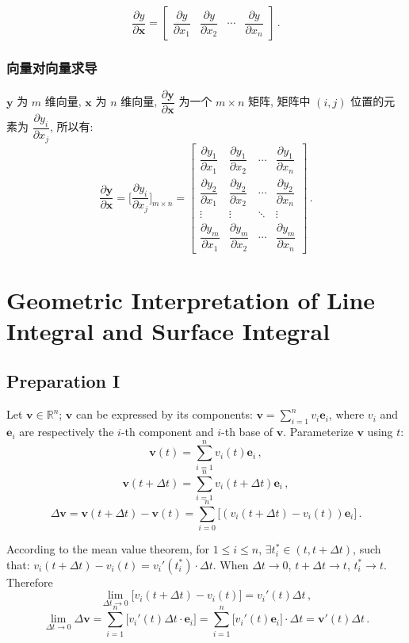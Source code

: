 \documentclass[UTF8]{ctexart}
\newcommand{\ve}[1]{\boldsymbol{\mathbf{#1}}}
\newcommand{\R}{\mathbb R}
\begin{document}
\[ \dfrac{\partial y}{\partial \ve{x}} = \begin{bmatrix}
    \dfrac{\partial y}{\partial x_1} & \dfrac{\partial y}{\partial x_2} & \cdots & \dfrac{\partial y}{\partial x_n}
\end{bmatrix} \,.\]

\subsubsection{向量对向量求导}
$ \ve{y} $ 为 $ m $ 维向量, $ \ve{x} $ 为 $ n $ 维向量, $ \dfrac{\partial \ve{y}}{\partial \ve{x}} $ 为一个 $ m \times n $ 矩阵, 矩阵中 $ (i, j) $ 位置的元素为 $ \dfrac{\partial y_i}{\partial x_j} $, 所以有: 
\[ \dfrac{\partial \ve{y}}{\partial \ve{x}} = \Big[ \dfrac{\partial y_i}{\partial x_j} \Big]_{m \times n} = \begin{bmatrix}
    \dfrac{\partial y_1}{\partial x_1} & \dfrac{\partial y_1}{\partial x_2} & \cdots & \dfrac{\partial y_1}{\partial x_n} \\
    \dfrac{\partial y_2}{\partial x_1} & \dfrac{\partial y_2}{\partial x_2} & \cdots & \dfrac{\partial y_2}{\partial x_n} \\
    \vdots & \vdots & \ddots & \vdots \\
    \dfrac{\partial y_m}{\partial x_1} & \dfrac{\partial y_m}{\partial x_2} & \cdots & \dfrac{\partial y_m}{\partial x_n} 
\end{bmatrix} \,.\]





\section{Geometric Interpretation of Line Integral and Surface Integral}
\subsection*{Preparation I}
Let $ \ve v \in \R^n $; $ \ve v $ can be expressed by its components: $\displaystyle \ve v = \sum_{i = 1}^n v_i \ve e_i $, where $ v_i $ and $ \ve e_i $ are respectively the $ i $-th component and $ i $-th base of $ \ve v $. Parameterize $ \ve v $ using $ t $:
\[ \ve v(t) = \sum_{i=1}^n v_i(t) \ve e_i \,,\]
\[ \ve v(t + \Delta t) = \sum_{i=1}^n v_i(t + \Delta t) \ve e_i \,,\]
\[ \Delta \ve v = \ve v(t + \Delta t) - \ve v(t) = \sum_{i=0}^{n} \big[ (v_i(t + \Delta t) - v_i(t)) \ve e_i \big] \,.\]

According to the mean value theorem, for $ 1 \leqslant i \leqslant n $, $ \exists t_i^* \in (t, t + \Delta t) $, such that: $ v_i (t + \Delta t) - v_i (t) = v_i'(t_i^*) \cdot \Delta t $. When $ \Delta t \to 0 $, $ t + \Delta t \to t $, $ t_i^* \to t $. Therefore
\[ \lim_{\Delta t \to 0} \big[  v_i (t + \Delta t) - v_i (t) \big] = v_i'(t) \Delta t \,,\]
\[ \lim_{\Delta t \to 0} \Delta \ve v = \sum_{i = 1}^n \big[ v_i'(t) \Delta t \cdot \ve e_i \big] = \sum_{i = 1}^n \big[ v_i'(t) \ve e_i \big]\cdot \Delta t = \ve v'(t) \Delta t \,. \tag{$ * $}\]
\end{document}
